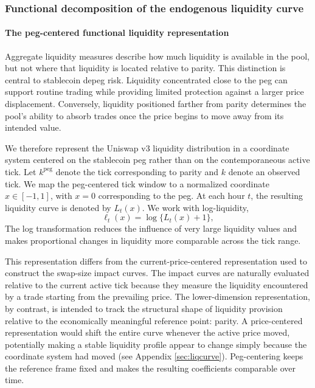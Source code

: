 \documentclass[a4paper,fleqn]{cas-sc}
\begin{document}
\subsubsection{Functional decomposition of the endogenous liquidity curve}
\paragraph{The peg-centered functional liquidity representation}
Aggregate liquidity measures describe how much liquidity is available in the pool, but not where that liquidity is located relative to parity. This distinction is central to stablecoin depeg risk. Liquidity concentrated close to the peg can support routine trading while providing limited protection against a larger price displacement. Conversely, liquidity positioned farther from parity determines the pool’s ability to absorb trades once the price begins to move away from its intended value.

We therefore represent the Uniswap v3 liquidity distribution in a coordinate system centered on the stablecoin peg rather than on the contemporaneous active tick. Let \(k^{\mathrm{peg}}\) denote the tick corresponding to parity and \(k\) denote an observed tick. We map the peg-centered tick window to a normalized coordinate \(x\in[-1,1]\), with \(x=0\) corresponding to the peg. At each hour \(t\), the resulting liquidity curve is denoted by \(L_t(x)\). We work with log-liquidity,
\begin{equation}
\ell_t(x)=\log\{L_t(x)+1\},
\end{equation}
The log transformation reduces the influence of very large liquidity values and makes proportional changes in liquidity more comparable across the tick range.

This representation differs from the current-price-centered representation used to construct the swap-size impact curves. The impact curves are naturally evaluated relative to the current active tick because they measure the liquidity encountered by a trade starting from the prevailing price. The lower-dimension representation, by contrast, is intended to track the structural shape of liquidity provision relative to the economically meaningful reference point: parity. A price-centered representation would shift the entire curve whenever the active price moved, potentially making a stable liquidity profile appear to change simply because the coordinate system had moved (see Appendix \ref{sec:liqcurve}). Peg-centering keeps the reference frame fixed and makes the resulting coefficients comparable over time.
\end{document}
